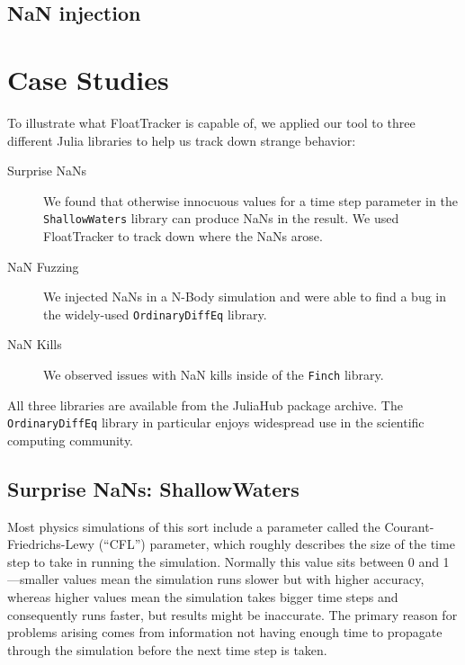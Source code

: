 \documentclass{juliacon}
\begin{document}
\subsection{NaN injection}

\section{Case Studies}

To illustrate what FloatTracker is capable of, we applied our tool to three different Julia libraries to help us track down strange behavior:

\begin{description}
\item[Surprise NaNs] We found that otherwise innocuous values for a time step parameter in the \texttt{ShallowWaters} library can produce NaNs in the result.
  We used FloatTracker to track down where the NaNs arose.
\item[NaN Fuzzing] We injected NaNs in a N-Body simulation and were able to find a bug in the widely-used \texttt{OrdinaryDiffEq} library.
\item[NaN Kills] We observed issues with NaN kills inside of the \texttt{Finch} library.
\end{description}

All three libraries are available from the JuliaHub package archive.
The \texttt{OrdinaryDiffEq} library in particular enjoys widespread use in the scientific computing community.

\subsection{Surprise NaNs: ShallowWaters}

Most physics simulations of this sort include a parameter called the Courant-Friedrichs-Lewy (``CFL'') parameter, which roughly describes the size of the time step to take in running the simulation.
Normally this value sits between 0 and 1---smaller values mean the simulation runs slower but with higher accuracy, whereas higher values mean the simulation takes bigger time steps and consequently runs faster, but results might be inaccurate.
The primary reason for problems arising comes from information not having enough time to propagate through the simulation before the next time step is taken.

\end{document}
